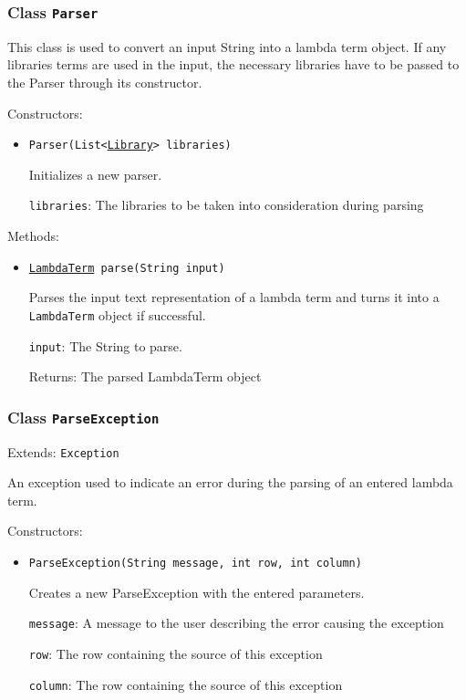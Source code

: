 \subsubsection{Class \texttt{Parser}}
\label{type:edu.kit.wavelength.client.model.term.parsing.Parser}
This class is used to convert an input String into a lambda term object. If
 any libraries terms are used in the input, the necessary libraries have to be
 passed to the Parser through its constructor.

Constructors:
\begin{itemize}
\item \texttt{Parser(List<\hyperref[type:edu.kit.wavelength.client.model.library.Library]{Library}> libraries)}

Initializes a new parser.

\texttt{libraries}: The libraries to be taken into consideration during parsing

\end{itemize}

Methods:
\begin{itemize}
\item \texttt{\hyperref[type:edu.kit.wavelength.client.model.term.LambdaTerm]{LambdaTerm} parse(String input)}

Parses the input text representation of a lambda term and turns it into a
 \texttt{LambdaTerm} object if successful.

\texttt{input}: The String to parse.

Returns: The parsed LambdaTerm object

\end{itemize}

\subsubsection{Class \texttt{ParseException}}
\label{type:edu.kit.wavelength.client.model.term.parsing.ParseException}
Extends: \texttt{Exception}

An exception used to indicate an error during the parsing of an entered lambda term.

Constructors:
\begin{itemize}
\item \texttt{ParseException(String message, int row, int column)}

Creates a new ParseException with the entered parameters.

\texttt{message}: A message to the user describing the error causing the exception

\texttt{row}: The row containing the source of this exception

\texttt{column}: The row containing the source of this exception

\end{itemize}

